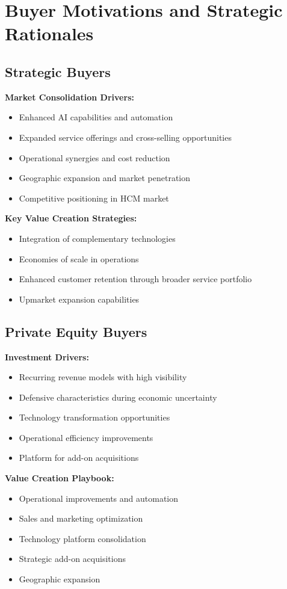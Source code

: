 \documentclass[12pt,a4paper]{article}
\begin{document}
\section{Buyer Motivations and Strategic Rationales}

\subsection{Strategic Buyers}

\textbf{Market Consolidation Drivers:}
\begin{itemize}
    \item Enhanced AI capabilities and automation
    \item Expanded service offerings and cross-selling opportunities
    \item Operational synergies and cost reduction
    \item Geographic expansion and market penetration
    \item Competitive positioning in HCM market
\end{itemize}

\textbf{Key Value Creation Strategies:}
\begin{itemize}
    \item Integration of complementary technologies
    \item Economies of scale in operations
    \item Enhanced customer retention through broader service portfolio
    \item Upmarket expansion capabilities
\end{itemize}

\subsection{Private Equity Buyers}

\textbf{Investment Drivers:}
\begin{itemize}
    \item Recurring revenue models with high visibility
    \item Defensive characteristics during economic uncertainty
    \item Technology transformation opportunities
    \item Operational efficiency improvements
    \item Platform for add-on acquisitions
\end{itemize}

\textbf{Value Creation Playbook:}
\begin{itemize}
    \item Operational improvements and automation
    \item Sales and marketing optimization
    \item Technology platform consolidation
    \item Strategic add-on acquisitions
    \item Geographic expansion
\end{itemize}
\end{document}
